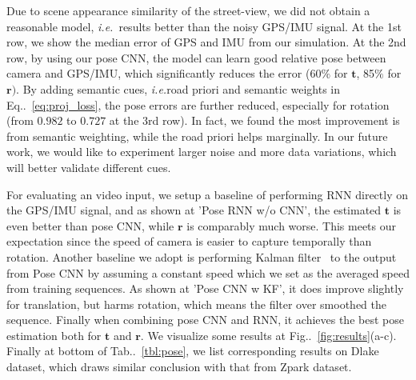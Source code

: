 \documentclass[10pt,twocolumn,letterpaper]{article}
\makeatletter
\newcommand{\figref}[1]{Fig\onedot~\ref{#1}}
\newcommand{\equref}[1]{Eq\onedot~\eqref{#1}}
\newcommand{\tabref}[1]{Tab\onedot~\ref{#1}}
\newcommand{\ve}[1]{{\mathbf #1}} %
\DeclareRobustCommand\onedot{\futurelet\@let@token\@onedot}
\def\onedot{\ifx\@let@token.\else.\null\fi\xspace}
\def\ie{\emph{i.e.}}
\makeatother
\begin{document}
Due to scene appearance similarity of the street-view, we did not obtain a reasonable model, \ie~results better than the noisy GPS/IMU signal.
At the 1st row, we show the median error of GPS and IMU from our simulation. 
At the 2nd row, by using our pose CNN, the model can learn good relative pose between camera and GPS/IMU, which significantly reduces the error (60$\%$ for $\ve{t}$, 85$\%$ for $\ve{r})$. 
By adding semantic cues, \ie road priori and semantic weights in \equref{eq:proj_loss}, the pose errors are further reduced, especially for rotation (from $0.982$ to $0.727$ at the 3rd row). In fact, we found the most improvement is from semantic weighting, while the road priori helps marginally. In our future work, we would like to experiment larger noise and more data variations, which will better validate different cues.

For evaluating an video input, we setup a baseline of performing RNN directly on the GPS/IMU signal, and as shown at 'Pose RNN w/o CNN', the estimated $\ve{t}$ is even better than pose CNN, while $\ve{r}$ is comparably much worse. This meets our expectation since the speed of camera is easier to capture temporally than rotation. Another baseline we adopt is performing Kalman filter~\cite{kalman1960new} to the output from Pose CNN by assuming a constant speed which we set as the averaged speed from training sequences. As shown at 'Pose CNN w KF', it does improve slightly for translation, but harms rotation, which means the filter over smoothed the sequence. Finally when combining pose CNN and RNN, it achieves the best pose estimation both for $\ve{t}$ and $\ve{r}$. We visualize some results at \figref{fig:results}(a-c).
Finally at bottom of \tabref{tbl:pose}, we list corresponding results on Dlake dataset, which draws similar conclusion with that from Zpark dataset.
\end{document}
